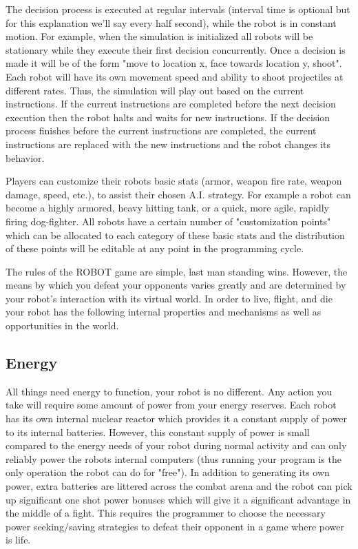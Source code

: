 \documentclass[a4paper]{article}
\begin{document}
The decision process is executed at regular intervals (interval time is optional but for this explanation we'll say every half second), while the robot is in constant motion. For example, when the simulation is initialized all robots will be stationary while they execute their first decision concurrently. Once a decision is made it will be of the form "move to location x, face towards location y, shoot". Each robot will have its own movement speed and ability to shoot projectiles at different rates. Thus, the simulation will play out based on the current instructions. If the current instructions are completed before the next decision execution then the robot halts and waits for new instructions. If the decision process finishes before the current instructions are completed, the current instructions are replaced with the new instructions and the robot changes its behavior.   

Players can customize their robots basic stats (armor, weapon fire rate, weapon damage, speed, etc.), to assist their chosen A.I. strategy. For example a robot can become a highly armored, heavy hitting tank, or a quick, more agile, rapidly firing dog-fighter. All robots have a certain number of "customization points" which can be allocated to each category of these basic stats and the distribution of these points will be editable at any point in the programming cycle.

The rules of the ROBOT game are simple, last man standing wins. However, the means by which you defeat your opponents varies greatly and are determined by your robot's interaction with its virtual world. In order to live, flight, and die your robot has the following internal properties and mechanisms as well as opportunities in the world.

\subsection{Energy}

All things need energy to function, your robot is no different. Any action you take will require some amount of power from your energy reserves. Each robot has its own internal nuclear reactor which provides it a constant supply of power to its internal batteries. However, this constant supply of power is small compared to the energy needs of your robot during normal activity and can only reliably power the robots internal computers (thus running your program is the only operation the robot can do for "free"). In addition to generating its own power, extra batteries are littered across the combat arena and the robot can pick up significant one shot power bonuses which will give it a significant advantage in the middle of a fight. This requires the programmer to choose the necessary power seeking/saving strategies to defeat their opponent in a game where power is life.
\end{document}
